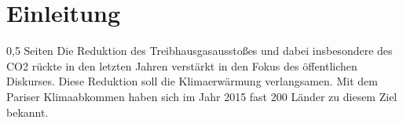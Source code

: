 \chapter{Einleitung}
0,5 Seiten
Die Reduktion des Treibhausgasausstoßes und dabei insbesondere des CO2 rückte in den letzten Jahren verstärkt in den Fokus des öffentlichen Diskurses.
Diese Reduktion soll die Klimaerwärmung verlangsamen.
Mit dem Pariser Klimaabkommen haben sich im Jahr 2015 fast 200 Länder zu diesem Ziel bekannt.